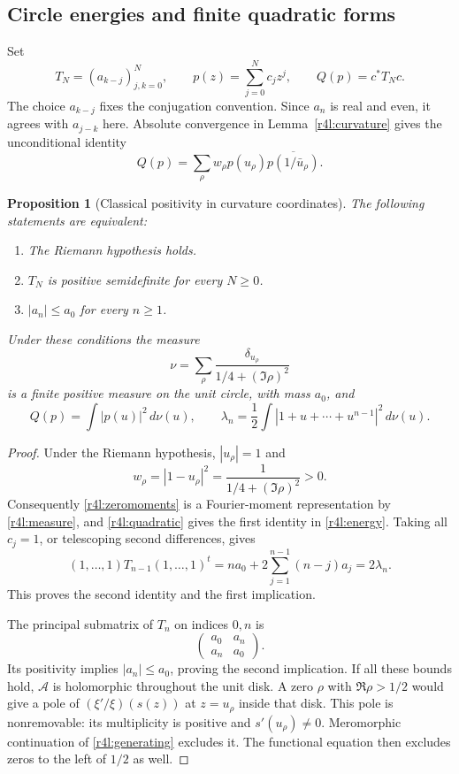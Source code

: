 \documentclass[11pt,a4paper]{article}
\newtheorem{proposition}[theorem]{Proposition}
\theoremstyle{definition}\newtheorem{definition}[theorem]{Definition}
\theoremstyle{remark}\newtheorem{remark}[theorem]{Remark}
\numberwithin{equation}{section}
\begin{document}
\subsection{Circle energies and finite quadratic forms}

Set
\[
 T_N=(a_{k-j})_{j,k=0}^N,
 \qquad p(z)=\sum_{j=0}^Nc_jz^j,
 \qquad Q(p)=c^*T_Nc.
\]
The choice $a_{k-j}$ fixes the conjugation convention.  Since $a_n$ is
real and even, it agrees with $a_{j-k}$ here.  Absolute convergence in
Lemma~\ref{r4l:curvature} gives the unconditional identity
\begin{equation}\label{r4l:quadratic}
 Q(p)=\sum_\rho w_\rho p(u_\rho)
                    \overline{p(1/\bar u_\rho)}.
\end{equation}

\begin{proposition}[Classical positivity in curvature coordinates]
\label{r4l:equivalence}
The following statements are equivalent:
\begin{enumerate}
\item The Riemann hypothesis holds.
\item $T_N$ is positive semidefinite for every $N\ge0$.
\item $|a_n|\le a_0$ for every $n\ge1$.
\end{enumerate}
Under these conditions the measure
\begin{equation}\label{r4l:measure}
 \nu=\sum_\rho\frac{\delta_{u_\rho}}{1/4+(\Im\rho)^2}
\end{equation}
is a finite positive measure on the unit circle, with mass $a_0$, and
\begin{equation}\label{r4l:energy}
 Q(p)=\int|p(u)|^2\,d\nu(u),
 \qquad
 \lambda_n=\frac12\int|1+u+\cdots+u^{n-1}|^2\,d\nu(u).
\end{equation}
\end{proposition}
\begin{proof}
Under the Riemann hypothesis, $|u_\rho|=1$ and
\[
 w_\rho=|1-u_\rho|^2
       =\frac1{1/4+(\Im\rho)^2}>0.
\]
Consequently \eqref{r4l:zeromoments} is a Fourier-moment representation
by \eqref{r4l:measure}, and \eqref{r4l:quadratic} gives the first
identity in \eqref{r4l:energy}.  Taking all $c_j=1$, or telescoping
second differences, gives
\[
 (1,\ldots,1)T_{n-1}(1,\ldots,1)^t
 =na_0+2\sum_{j=1}^{n-1}(n-j)a_j=2\lambda_n.
\]
This proves the second identity and the first implication.

The principal submatrix of $T_n$ on indices $0,n$ is
\[
 \begin{pmatrix}a_0&a_n\\a_n&a_0\end{pmatrix}.
\]
Its positivity implies $|a_n|\le a_0$, proving the second implication.
If all these bounds hold, $\mathcal A$ is holomorphic throughout the
unit disk.  A zero $\rho$ with $\Re\rho>1/2$ would give a pole of
$(\xi'/\xi)(s(z))$ at $z=u_\rho$ inside that disk.  This pole is
nonremovable: its multiplicity is positive and $s'(u_\rho)\ne0$.
Meromorphic continuation of \eqref{r4l:generating} excludes it.  The
functional equation then excludes zeros to the left of $1/2$ as well.
\end{proof}
\end{document}
